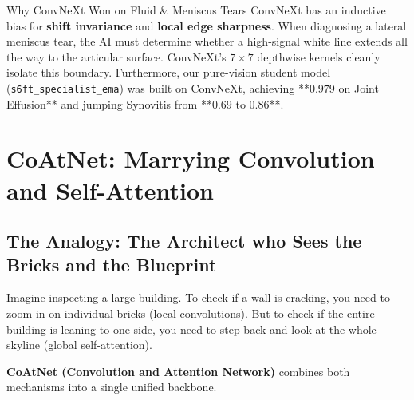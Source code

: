 \documentclass[11pt,a4paper]{article}
\begin{document}
\begin{breakthroughbox}{Why ConvNeXt Won on Fluid \& Meniscus Tears}
ConvNeXt has an inductive bias for \textbf{shift invariance} and \textbf{local edge sharpness}. When diagnosing a lateral meniscus tear, the AI must determine whether a high-signal white line extends all the way to the articular surface. ConvNeXt's $7\times 7$ depthwise kernels cleanly isolate this boundary. Furthermore, our pure-vision student model (\texttt{s6ft\_specialist\_ema}) was built on ConvNeXt, achieving **$0.979$ on Joint Effusion** and jumping Synovitis from **$0.69$ to $0.86$**.
\end{breakthroughbox}

\newpage

\section{CoAtNet: Marrying Convolution and Self-Attention}

\subsection{The Analogy: The Architect who Sees the Bricks and the Blueprint}
Imagine inspecting a large building. To check if a wall is cracking, you need to zoom in on individual bricks (local convolutions). But to check if the entire building is leaning to one side, you need to step back and look at the whole skyline (global self-attention). 

\textbf{CoAtNet (Convolution and Attention Network)} combines both mechanisms into a single unified backbone.
\end{document}
